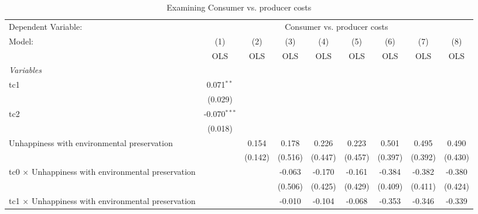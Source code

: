 
\begin{table}[htbp]
   \caption{Examining Consumer vs. producer costs}
   \centering
   \begin{tabular}{lcccccccc}
      \toprule
      Dependent Variable: & \multicolumn{8}{c}{Consumer vs. producer costs}\\
      Model:                                                    & (1)            & (2)     & (3)     & (4)         & (5)         & (6)         & (7)         & (8)\\  
                                                                &  OLS           & OLS     & OLS     & OLS         & OLS         & OLS         & OLS         & OLS\\  
      \midrule
      \emph{Variables}\\
      tc1                                                       & 0.071$^{**}$   &         &         &             &             &             &             &   \\   
                                                                & (0.029)        &         &         &             &             &             &             &   \\   
      tc2                                                       & -0.070$^{***}$ &         &         &             &             &             &             &   \\   
                                                                & (0.018)        &         &         &             &             &             &             &   \\   
      Unhappiness with environmental preservation               &                & 0.154   & 0.178   & 0.226       & 0.223       & 0.501       & 0.495       & 0.490\\   
                                                                &                & (0.142) & (0.516) & (0.447)     & (0.457)     & (0.397)     & (0.392)     & (0.430)\\   
      tc0 $\times$ Unhappiness with environmental preservation  &                &         & -0.063  & -0.170      & -0.161      & -0.384      & -0.382      & -0.380\\   
                                                                &                &         & (0.506) & (0.425)     & (0.429)     & (0.409)     & (0.411)     & (0.424)\\   
      tc1 $\times$ Unhappiness with environmental preservation  &                &         & -0.010  & -0.104      & -0.068      & -0.353      & -0.346      & -0.339\\   

\end{tabular}
\end{table}
